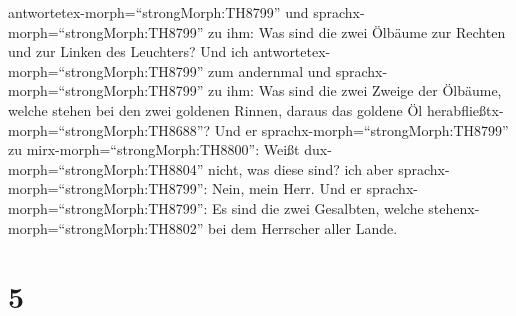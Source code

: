 antwortetex-morph=``strongMorph:TH8799'' und
sprachx-morph=``strongMorph:TH8799'' zu ihm: Was sind die zwei Ölbäume
zur Rechten und zur Linken des Leuchters?  Und ich
antwortetex-morph=``strongMorph:TH8799'' zum andernmal und
sprachx-morph=``strongMorph:TH8799'' zu ihm: Was sind die zwei Zweige
der Ölbäume, welche stehen bei den zwei goldenen Rinnen, daraus das
goldene Öl herabfließtx-morph=``strongMorph:TH8688''?  Und
er sprachx-morph=``strongMorph:TH8799'' zu
mirx-morph=``strongMorph:TH8800'': Weißt
dux-morph=``strongMorph:TH8804'' nicht, was diese sind? ich aber
sprachx-morph=``strongMorph:TH8799'': Nein, mein Herr.  Und
er sprachx-morph=``strongMorph:TH8799'': Es sind die zwei Gesalbten,
welche stehenx-morph=``strongMorph:TH8802'' bei dem Herrscher aller
Lande.

\hypertarget{section-4}{%
\section{5}\label{section-4}}

